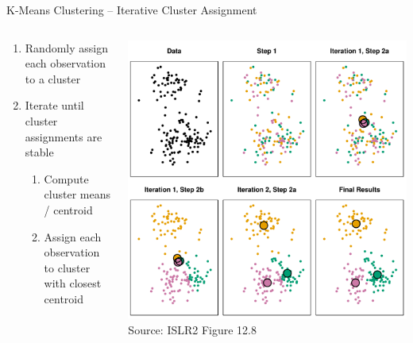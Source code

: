 \documentclass[ignorenonframetext,xcolor=x11names]{beamer}
\begin{document}
\begin{frame}{K-Means Clustering -- Iterative Cluster Assignment}
\begin{columns}
\begin{column}{0.35\textwidth}
\small
\begin{enumerate}
   \item Randomly assign each observation to a cluster
   \item Iterate until cluster assignments are stable
   \begin{enumerate}
       \small
       \item Compute cluster means / centroid
       \item Assign each observation to cluster with closest centroid
   \end{enumerate}
\end{enumerate}
\end{column}
\begin{column}{0.65\textwidth}
\centering
\includegraphics[width=\textwidth]{../class11/Figures_Chapters_7-13/Chapter12/12_8.pdf} \\

\scriptsize Source: ISLR2 Figure 12.8
\end{column}
\end{columns}
\end{frame}
\end{document}

